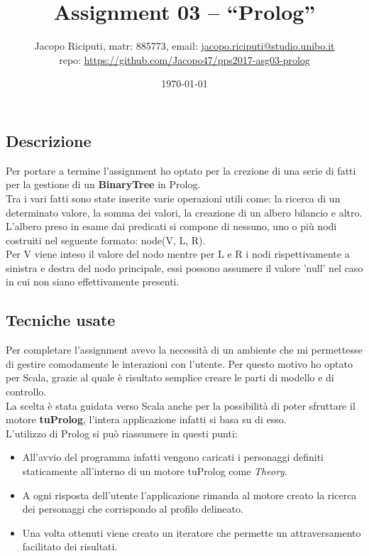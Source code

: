 \documentclass[10pt,italian]{article} %
\title{\vspace{-70pt}Assignment 03 -- ``Prolog''}
\author{Jacopo Riciputi, matr: 885773, email: {\url{jacopo.riciputi@studio.unibo.it}}\\ repo: {\url{https://github.com/Jacopo47/pps2017-asg03-prolog}} }
\date{\today}
\begin{document}
\maketitle
\vspace{-30pt}

\subsection{Descrizione}

Per portare a termine l'assignment ho optato per la crezione di una serie di fatti per la gestione di un \textbf{BinaryTree} in Prolog. \\
Tra i vari fatti sono state inserite varie operazioni utili come: la ricerca di un determinato valore, la somma dei valori, la creazione di un albero bilancio e altro.
L'albero preso in esame dai predicati si compone di nessuno, uno o più nodi costruiti nel seguente formato: node(V, L, R). \\
Per V viene inteso il valore del nodo mentre per L e R i nodi rispettivamente a sinistra e destra del nodo principale, essi possono assumere il valore 'null' nel caso in cui non siano effettivamente presenti.

\subsection{Tecniche usate}
Per completare l'assignment avevo la necessità di un ambiente che mi permettesse di gestire comodamente le interazioni con l'utente.
Per questo motivo ho optato per Scala, grazie al quale è risultato semplice creare le parti di modello e di controllo. \\
La scelta è stata guidata verso Scala anche per la possibilità di poter sfruttare il motore \textbf{tuProlog}, l'intera applicazione infatti si basa su di esso. \\

L'utilizzo di Prolog si può riassumere in questi punti: 
  \begin{itemize}
   \item All'avvio del programma infatti vengono caricati i personaggi definiti staticamente all'interno di un motore tuProlog come \textit{Theory}.
   \item A ogni risposta dell'utente l'applicazione rimanda al motore creato la ricerca dei personaggi che corrispondo al profilo delineato. 
   \item Una volta ottenuti viene creato un iteratore che permette un attraversamento facilitato dei risultati. 
  \end{itemize}
\end{document}
